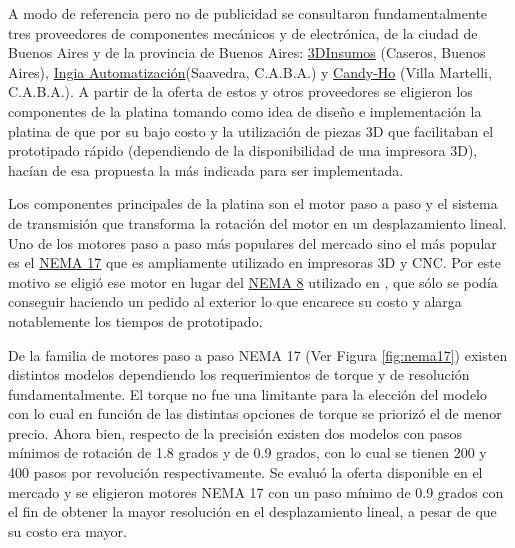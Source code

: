 A modo de referencia pero no de publicidad se consultaron fundamentalmente tres proveedores de componentes mecánicos y de electrónica, de la ciudad de Buenos Aires y de la provincia de Buenos Aires: \href{https://3dinsumos.com.ar/}{3DInsumos} (Caseros, Buenos Aires), \href{https://ingia.com.ar/}{Ingia Automatización}(Saavedra, C.A.B.A.) y \href{https://candy-ho.com/}{Candy-Ho} (Villa Martelli, C.A.B.A.). A partir de la oferta de estos y otros proveedores se eligieron los componentes de la platina tomando como idea de diseño e implementación la platina de \cite{schaa} que por su bajo costo y la utilización de piezas 3D que facilitaban el prototipado rápido (dependiendo de la disponibilidad de una impresora 3D), hacían de esa propuesta la más indicada para ser implementada.

Los componentes principales de la platina son el motor paso a paso y el sistema de transmisión que transforma la rotación del motor en un desplazamiento lineal. Uno de los motores paso a paso más populares del mercado sino el más popular es el \href{https://www.pololu.com/product/1200}{NEMA 17} que es ampliamente utilizado en impresoras 3D y CNC. Por este motivo se eligió ese motor en lugar del \href{https://www.pololu.com/product/1204}{NEMA 8} utilizado en \cite{schaa}, que sólo se podía conseguir haciendo un pedido al exterior lo que encarece su costo y alarga notablemente los tiempos de prototipado.

De la familia de motores paso a paso NEMA 17 (Ver Figura \ref{fig:nema17}) existen distintos modelos dependiendo los requerimientos de torque y de resolución fundamentalmente. El torque no fue una limitante para la elección del modelo con lo cual en función de las distintas opciones de torque se priorizó el de menor precio. Ahora bien, respecto de la precisión existen dos modelos con pasos mínimos de rotación de 1.8 grados y de 0.9 grados, con lo cual se tienen 200 y 400 pasos por revolución respectivamente. Se evaluó la oferta disponible en el mercado y se eligieron motores NEMA 17 con un paso mínimo de 0.9 grados con el fin de obtener la mayor resolución en el desplazamiento lineal, a pesar de que su costo era mayor.

